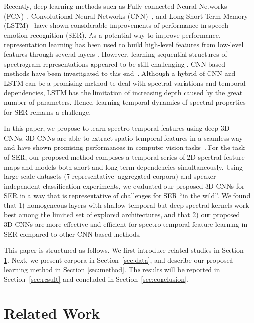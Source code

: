 \documentclass[conference, compsoc, twoside]{IEEEtran}
\begin{document}
Recently, deep learning methods such as Fully-connected Neural Networks (FCN)~\cite{kunHan2014dnn}, Convolutional Neural Networks (CNN)~\cite{zheng2015experimental,mao2014learning}, and Long Short-Term Memory (LSTM)~\cite{trigeorgis2016adieu,lee2015high} have shown considerable improvements of performance in speech emotion recognition (SER). As a potential way to improve performance, representation learning has been used to build high-level features from low-level features through several layers \cite{bengio2013representation,zheng2015experimental,mao2014learning}. However, learning sequential structures of spectrogram representations appeared to be still challenging \cite{ghoshrepresentation2016}. CNN-based methods have been investigated to this end~\cite{zheng2015experimental,mao2014learning,anandconvoluted,trigeorgis2016adieu}. Although a hybrid of CNN and LSTM can be a promising method to deal with spectral variations and temporal dependencies, LSTM has the limitation of increasing depth caused by the great number of parameters. Hence, learning temporal dynamics of spectral properties for SER remains a challenge.

In this paper, we propose to learn spectro-temporal features using deep 3D CNNs. 3D CNNs are able to extract spatio-temporal features in a seamless way and have shown promising performances in computer vision tasks~\cite{ji20133d,tran2015learning}. For the task of SER, our proposed method composes a temporal series of 2D spectral feature maps and models both short and long-term dependencies simultaneously. Using large-scale datasets (7 representative, aggregated corpora) and speaker-independent classification experiments, we evaluated our proposed 3D CNNs for SER in a way that is representative of challenges for SER ``in the wild''. We found that 1) homogeneous layers with shallow temporal but deep spectral kernels work best among the limited set of explored architectures, and that 2) our proposed 3D CNNs are more effective and efficient for spectro-temporal feature learning in SER compared to other CNN-based methods.

This paper is structured as follows. We first introduce related studies in Section \ref{sec:relatedwork}. Next, we present corpora in Section~\ref{sec:data}, and describe our proposed learning method in Section \ref{sec:method}. The results will be reported in Section~\ref{sec:result} and concluded in Section~\ref{sec:conclusion}.

\section{Related Work}\label{sec:relatedwork}
\end{document}
